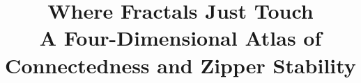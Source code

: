 \title{\texorpdfstring{Where Fractals Just Touch\\[.25cm]
{\fontsize{42}{50}\selectfont A Four-Dimensional Atlas of Connectedness and Zipper Stability}}
{Where Fractals Just Touch: A Four-Dimensional Atlas of Connectedness and Zipper Stability}}
